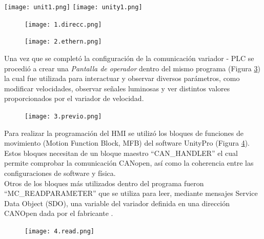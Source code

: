 \begin{center}
	\texttt{[image: unit1.png]}
	\label{fig:uni1}
	\texttt{[image: unity1.png]}
	\label{fig:uni0}
\end{center}

\begin{figure}[h]
	\centering
	\texttt{[image: 1.direcc.png]}
	\label{fig:direcc}
\end{figure}


\begin{figure}[h]
	\centering
	\texttt{[image: 2.ethern.png]}
	\label{fig:inter}
\end{figure}

Una vez que se completó la configuración de la comunicación variador - PLC se procedió a crear una \textit{Pantalla de operador} dentro del mismo programa (Figura \ref{fig:previo})
la cual fue utilizada para interactuar y observar diversos parámetros, como modificar velocidades, observar señales luminosas y ver distintos valores proporcionados por el variador de velocidad.
 
\begin{figure}[H]
	\centering
	\texttt{[image: 3.previo.png]}
	\label{fig:previo}
\end{figure}

Para realizar la programación del HMI se utilizó los bloques de funciones de movimiento (Motion Function Block, MFB) del software UnityPro (Figura \ref{fig:read}). Estos bloques necesitan de un bloque maestro ``CAN\_HANDLER'' el cual permite comprobar la comunicación CANopen, así como la coherencia
entre las configuraciones de software y física.
\\
Otros de los bloques más utilizados dentro del programa fueron ``MC\_READPARAMETER'' que se utiliza para leer, mediante mensajes Service Data Object
(SDO), una variable del variador definida en una dirección CANOpen dada por el fabricante \cite{ComManual}.

\begin{figure}[H]
	\centering
	\texttt{[image: 4.read.png]}
	\label{fig:read}
\end{figure}

